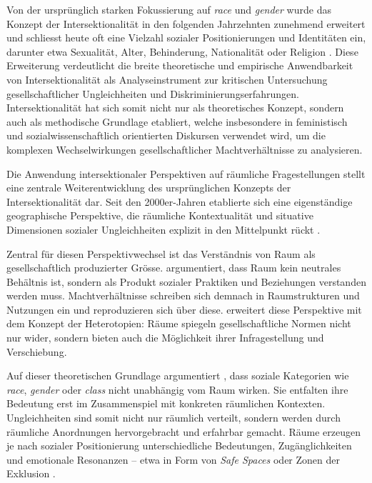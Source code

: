 Von der ursprünglich starken Fokussierung auf \textit{race} und \textit{gender} wurde das Konzept der Intersektionalität in den folgenden Jahrzehnten zunehmend erweitert und schliesst heute oft eine Vielzahl sozialer Positionierungen und Identitäten ein, darunter etwa Sexualität, Alter, Behinderung, Nationalität oder Religion \parencite{bauerIntersectionalityQuantitativeResearch2021, bowlegInvitedReflectionQuantifying2016}. Diese Erweiterung verdeutlicht die breite theoretische und empirische Anwendbarkeit von Intersektionalität als Analyseinstrument zur kritischen Untersuchung gesellschaftlicher Ungleichheiten und Diskriminierungserfahrungen. Intersektionalität hat sich somit nicht nur als theoretisches Konzept, sondern auch als methodische Grundlage etabliert, welche insbesondere in feministisch und sozialwissenschaftlich orientierten Diskursen verwendet wird, um die komplexen Wechselwirkungen gesellschaftlicher Machtverhältnisse zu analysieren.

\vspace{2em}

Die Anwendung intersektionaler Perspektiven auf räumliche Fragestellungen stellt eine zentrale Weiterentwicklung des ursprünglichen Konzepts der Intersektionalität dar. Seit den 2000er-Jahren etablierte sich eine eigenständige geographische Perspektive, die räumliche Kontextualität und situative Dimensionen sozialer Ungleichheiten explizit in den Mittelpunkt rückt \parencite{valentineTheorizingResearchingIntersectionality2007,rodo-de-zarateIntersectionalityFeministGeographies2018}.

Zentral für diesen Perspektivwechsel ist das Verständnis von Raum als gesellschaftlich produzierter Grösse. \textcite{lefebvreProductionLespace1974} argumentiert, dass Raum kein neutrales Behältnis ist, sondern als Produkt sozialer Praktiken und Beziehungen verstanden werden muss. Machtverhältnisse schreiben sich demnach in Raumstrukturen und Nutzungen ein und reproduzieren sich über diese. \textcite{foucaultEspacesAutres2004} erweitert diese Perspektive mit dem Konzept der Heterotopien: Räume spiegeln gesellschaftliche Normen nicht nur wider, sondern bieten auch die Möglichkeit ihrer Infragestellung und Verschiebung.

Auf dieser theoretischen Grundlage argumentiert \textcite{valentineTheorizingResearchingIntersectionality2007}, dass soziale Kategorien wie \textit{race}, \textit{gender} oder \textit{class} nicht unabhängig vom Raum wirken. Sie entfalten ihre Bedeutung erst im Zusammenspiel mit konkreten räumlichen Kontexten. Ungleichheiten sind somit nicht nur räumlich verteilt, sondern werden durch räumliche Anordnungen hervorgebracht und erfahrbar gemacht. Räume erzeugen je nach sozialer Positionierung unterschiedliche Bedeutungen, Zugänglichkeiten und emotionale Resonanzen -- etwa in Form von \textit{Safe Spaces} oder Zonen der Exklusion \parencite[\gls{vgl}][S.~548--549]{rodo-de-zarateIntersectionalityFeministGeographies2018}.


